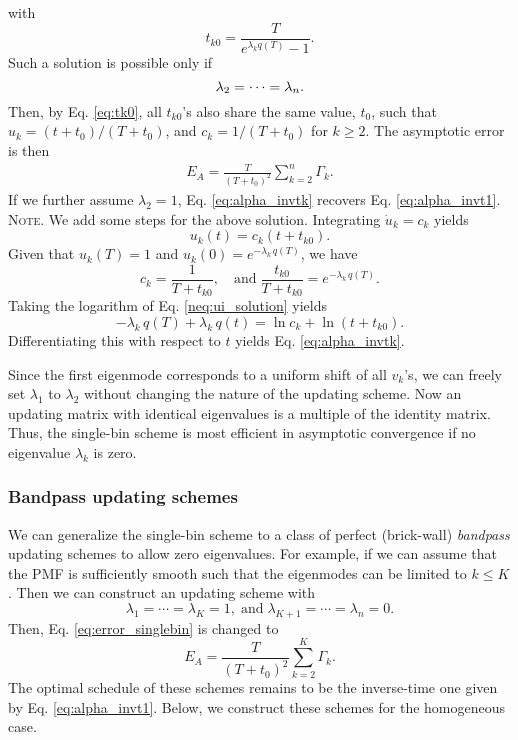 \documentclass[reprint, floatfix]{revtex4-1}
\newcommand{\note}[1]{{\color{DarkGreen}\footnotesize \textsc{Note.} #1}}
\begin{document}
with
\begin{equation}
  t_{k0} = \frac{             T            }
                { e^{ \lambda_k q(T) } - 1 }.
\label{eq:tk0}
\end{equation}
%
Such a solution is possible only if
%
\begin{equation}
  \lambda_2 = \dots = \lambda_n.
  \notag
\end{equation}
%
Then, by Eq. \eqref{eq:tk0},
all $t_{k0}$'s also share the same value,
$t_0$,
such that
$u_k = (t + t_0) / (T + t_0)$,
and
$c_k = 1/(T + t_0)$
for $k \ge 2$.
%
The asymptotic error is then
\begin{align}
  E_A
  =
  \frac{       T     }
       { (T + t_0)^2 }
  \sum_{ k = 2 }^n
    \Gamma_k
  .
\label{eq:error_singlebin}
\end{align}
%
If we further assume $\lambda_2 = 1$,
Eq. \eqref{eq:alpha_invtk}
recovers Eq. \eqref{eq:alpha_invt1}.
%
\note{We add some steps for the above solution.
  Integrating $\dot u_k = c_k$ yields
  \begin{equation}
    u_k(t) = c_k \left(t + t_{k0} \right).
  \tag{N4}
  \label{neq:ui_solution}
  \end{equation}
  Given that $u_k(T) = 1$ and $u_k(0) = e^{-\lambda_k \, q(T)}$,
  we have
  $$
  c_k = \frac{ 1 }{ T + t_{k0} },
  \quad
  \mathrm{and\;}
  \frac{ t_{k0} } { T + t_{k0} }
  =
  e^{ -\lambda_k \, q(T) }.
  $$
  Taking the logarithm of Eq. \eqref{neq:ui_solution} yields
  $$
  -\lambda_k \, q(T) + \lambda_k \, q(t)
  = \ln c_k + \ln \left( t + t_{k0} \right).
  $$
  Differentiating this with respect to $t$ yields
  Eq. \eqref{eq:alpha_invtk}.
}

Since the first eigenmode corresponds to
a uniform shift of all $v_k$'s,
we can freely set $\lambda_1$ to $\lambda_2$
without changing the nature of the updating scheme.
%
Now an updating matrix
with identical eigenvalues
is a multiple of the identity matrix.
%
Thus,
the single-bin scheme is most efficient
in asymptotic convergence
if no eigenvalue $\lambda_k$ is zero.



\subsubsection{\label{sec:optscheme}
Bandpass updating schemes}


We can generalize
the single-bin scheme to a class of
perfect (brick-wall) \emph{bandpass} updating schemes
to allow zero eigenvalues.
%
For example,
if we can assume that the PMF is sufficiently smooth
such that the eigenmodes can be limited to $k \le K$.
%
Then we can construct an updating scheme with
$$
\lambda_1 = \cdots = \lambda_K = 1,
\mathrm{\; and \;}
\lambda_{K+1} = \cdots = \lambda_n = 0.
$$
%
Then,
Eq. \eqref{eq:error_singlebin} is changed to
%
\begin{equation}
  E_A
  =
  \frac {       T     }
        { (T + t_0)^2 }
  \sum_{ k = 2 }^K
    \Gamma_k.
\label{eq:error_asym_sinc}
\end{equation}
%
The optimal schedule of these schemes
remains to be the inverse-time one
given by Eq. \eqref{eq:alpha_invt1}.
%
Below, we construct these schemes for
the homogeneous case.
\end{document}
